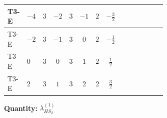 \documentclass[8pt]{article}
\begin{document}
\begin{landscape}
\begin{longtable}{@{}llcccccc >{\raggedright\arraybackslash}p{0.21\linewidth} >{\raggedright\arraybackslash}p{0.21\linewidth} >{\raggedright\arraybackslash}p{0.21\linewidth}@{}}
T3-E & $-4$ & $3$ & $-2$ & $3$ & $-1$ & $2$ & $-\frac{3}{2}$ & \scriptsize\adjustbox{max width=\linewidth}{$\begin{gathered} +4 {\lambda_{HS_2}^{(1)}}^2\end{gathered}$} & \scriptsize\adjustbox{max width=\linewidth}{$\begin{gathered} +8 {\lambda_{HS_2}^{(1)}} {\lambda_{S_2}^{(1)}}\end{gathered}$} & \scriptsize\adjustbox{max width=\linewidth}{$\begin{gathered} +6 {\lambda_{HS_2}^{(A)}}^2\end{gathered}$} \\
\midrule
T3-E & $-2$ & $3$ & $-1$ & $3$ & $0$ & $2$ & $-\frac{1}{2}$ & \scriptsize\adjustbox{max width=\linewidth}{$\begin{gathered} +4 {\lambda_{HS_2}^{(1)}}^2\end{gathered}$} & \scriptsize\adjustbox{max width=\linewidth}{$\begin{gathered} +8 {\lambda_{HS_2}^{(1)}} {\lambda_{S_2}^{(1)}}\end{gathered}$} & \scriptsize\adjustbox{max width=\linewidth}{$\begin{gathered} +6 {\lambda_{HS_2}^{(A)}}^2\end{gathered}$} \\
\midrule
T3-E & $0$ & $3$ & $0$ & $3$ & $1$ & $2$ & $\frac{1}{2}$ & \scriptsize\adjustbox{max width=\linewidth}{$\begin{gathered} +4 {\lambda_{HS_2}^{(1)}}^2\end{gathered}$} & \scriptsize\adjustbox{max width=\linewidth}{$\begin{gathered} +8 {\lambda_{HS_2}^{(1)}} {\lambda_{S_2}^{(1)}}\end{gathered}$} & \scriptsize\adjustbox{max width=\linewidth}{$\begin{gathered} +6 {\lambda_{HS_2}^{(A)}}^2\end{gathered}$} \\
\midrule
T3-E & $2$ & $3$ & $1$ & $3$ & $2$ & $2$ & $\frac{3}{2}$ & \scriptsize\adjustbox{max width=\linewidth}{$\begin{gathered} +4 {\lambda_{HS_2}^{(1)}}^2\end{gathered}$} & \scriptsize\adjustbox{max width=\linewidth}{$\begin{gathered} +8 {\lambda_{HS_2}^{(1)}} {\lambda_{S_2}^{(1)}}\end{gathered}$} & \scriptsize\adjustbox{max width=\linewidth}{$\begin{gathered} +6 {\lambda_{HS_2}^{(A)}}^2\end{gathered}$} \\
\midrule
\bottomrule
\end{longtable}
\clearpage
\noindent\textbf{Quantity: }$\lambda_{HS_2}^{(1)}$\par\smallskip

\end{landscape}
\end{document}
